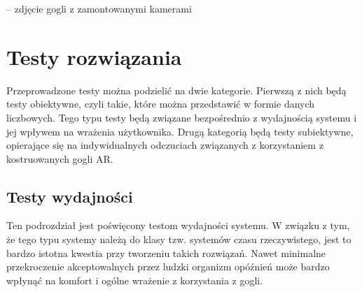 \documentclass[a4paper,11pt,twoside]{report}
\theoremstyle{definition}
\begin{document}
-- zdjęcie gogli z zamontowanymi kamerami

\section{Testy rozwiązania}
Przeprowadzone testy można podzielić na dwie kategorie. Pierwszą z nich będą testy obiektywne, czyli takie, które można przedstawić w formie danych liczbowych. Tego typu testy będą związane bezpośrednio z wydajnością systemu i jej wpływem na wrażenia użytkownika. Drugą kategorią będą testy subiektywne, opierające się na indywidualnych odczuciach związanych z korzystaniem z kostruowanych gogli AR. 

\subsection{Testy wydajności}
Ten podrozdział jest poświęcony testom wydajności systemu. W związku z tym, że tego typu systemy należą do klasy tzw. systemów czasu rzeczywistego, jest to bardzo istotna kwestia przy tworzeniu takich rozwiązań. Nawet minimalne przekroczenie akceptowalnych przez ludzki organizm opóźnień może bardzo wpłynąć na komfort i ogólne wrażenie z korzystania z gogli.
\end{document}
